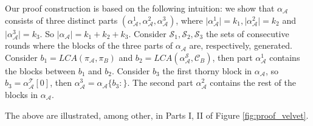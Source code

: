 Our proof construction is based on the following intuition: we show that
$\alpha_\mathcal{A}$ consists of three distinct parts $(\alpha_\mathcal{A}
^1, \alpha_\mathcal{A}^2, \alpha_\mathcal{A}^3)$, where $\vert 
\alpha_\mathcal{A}^1 \vert = k_1, \vert \alpha_\mathcal{A}^2 \vert = k_2$
and $\vert \alpha_\mathcal{A}^3 \vert = k_3$. So $\vert \alpha_\mathcal{A} \vert = k_1 + k_2 + k_3$. Consider $\mathcal{S}_1,
\mathcal{S}_2, \mathcal{S}_3$ the sets of consecutive rounds where the
blocks of the three parts of $\alpha_\mathcal{A}$ are, respectively, 
generated. Consider $b_1 = LCA(\pi_\mathcal{A}, \pi_B)$ and $b_2 = LCA
(\alpha^{\mathcal{S}}_\mathcal{A}, \mathcal{C}_B)$, then part 
$\alpha_\mathcal{A}^1$ contains the blocks between $b_1$ and $b_2$. 
Consider $b_3$ the first thorny block in $\alpha_\mathcal{A}$, so $b_3 = \alpha_\mathcal{A}^{\mathcal{T}}[0]$, then 
$\alpha_\mathcal{A}^3 = \alpha_\mathcal{A}\{b_3:\}$. The second part 
$\alpha_\mathcal{A}^2$ contains the rest of the blocks in $\alpha_\mathcal{A}$. 

The above are illustrated, among other, in Parts I, II of Figure \ref{fig:proof_velvet}.

